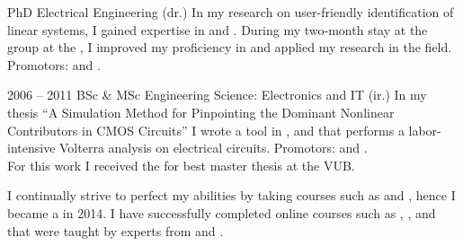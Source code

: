 \documentclass{cv-egeerardyn}
\begin{document}
\maketitle

\begin{education}
  {PhD Electrical Engineering (dr.)}{\VUB}
  {In my research on user-friendly identification of linear systems, I gained expertise in  and . During my two-month stay at the \CST{} group at the \TUe, I improved my proficiency in  and applied my research in the field.
  Promotors: \JohanSchoukens{} and \TomOomen.}

  \addEducation%
  {2006 -- 2011}
  {BSc \& MSc Engineering Science: Electronics  and IT (ir.)}
  {\VUB}
  {In my thesis ``A Simulation Method for Pinpointing the Dominant Nonlinear Contributors in CMOS Circuits'' I wrote a tool in ,  and  that performs a labor-intensive Volterra analysis on electrical circuits. 
  Promotors: \PietWambacq{} and \GerdVandersteen.\\
  For this work I received the  for best master thesis at the VUB.}

  {I continually strive to perfect my abilities by taking courses such as 
  and 
  , 
  hence I became a 
  in 2014. 
  I have successfully completed online courses such as 
  , 
  , 
   and 
  that were taught by experts from \Stanford{} and \EPFL{}.}

\end{education}
\end{document}
